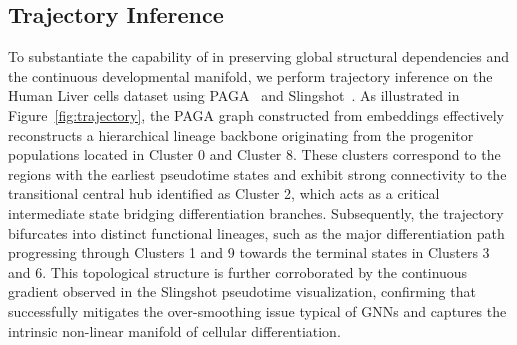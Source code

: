 \begin{appendix}



\section{Trajectory Inference}
\label{sec:trajectory}
To substantiate the capability of \method{} in preserving global structural dependencies and the continuous developmental manifold, we perform trajectory inference on the Human Liver cells dataset using PAGA~\cite{wolf2019paga} and Slingshot~\cite{street2018slingshot}. As illustrated in Figure~\ref{fig:trajectory}, the PAGA graph constructed from \method{} embeddings effectively reconstructs a hierarchical lineage backbone originating from the progenitor populations located in Cluster 0 and Cluster 8. These clusters correspond to the regions with the earliest pseudotime states and exhibit strong connectivity to the transitional central hub identified as Cluster 2, which acts as a critical intermediate state bridging differentiation branches. Subsequently, the trajectory bifurcates into distinct functional lineages, such as the major differentiation path progressing through Clusters 1 and 9 towards the terminal states in Clusters 3 and 6. This topological structure is further corroborated by the continuous gradient observed in the Slingshot pseudotime visualization, confirming that \method{} successfully mitigates the over-smoothing issue typical of GNNs and captures the intrinsic non-linear manifold of cellular differentiation.


% 




\end{appendix}
